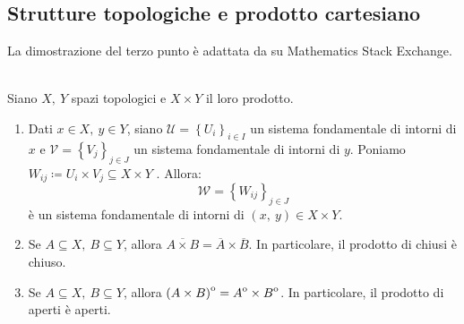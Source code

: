 \subsection{Strutture topologiche e prodotto cartesiano}
La dimostrazione del terzo punto è adattata da \cite{Math1000:interior} su Mathematics Stack Exchange.
\begin{proposition}~{}\\\label{topologiaprodottostruttura}
	Siano $X,\ Y$ spazi topologici e $X\times Y$ il loro prodotto.
	\begin{enumerate}
		\item Dati $x\in X,\ y\in Y$, siano $\mathcal{U} = \left\{U_i\right\}_{i\in I}$ un
		sistema fondamentale di intorni di $x$ e $\mathcal{V} = \left\{V_j\right\}_{j\in J}$ un sistema fondamentale di intorni di $y$. Poniamo $W_{ij} \coloneqq U_i \times V_j \subseteq X \times Y$ . Allora:
		\begin{equation}
			\mathcal{W} = \left\{W_{ij}\right\}_{j\in J}
		\end{equation}
		è un sistema fondamentale di intorni di $\left(x,\ y\right) \in X \times Y$.
		\item Se $A\subseteq X,\ B\subseteq Y$, allora $\overline{A\times B}=\overline{A}\times \overline{B}$. In particolare, il prodotto di chiusi è chiuso.
		\item Se $A\subseteq X,\ B\subseteq Y$, allora ${\kern0pt\left(A\times B\right)}^{\mathrm{o}}={\kern0ptA}^{\mathrm{o}}\times {\kern0ptB}^{\mathrm{o}}$. In particolare, il prodotto di aperti è aperti.
	\end{enumerate}
	\vspace{-3mm}
\end{proposition}
